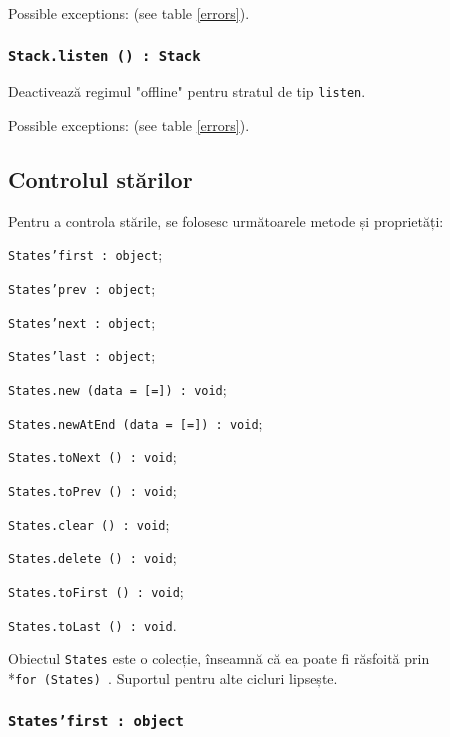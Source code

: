 Possible exceptions:  (see table \ref{errors}).

\subsubsection{\texttt{Stack.listen () : Stack}}

Deactivează regimul "offline" pentru stratul de tip \texttt{listen}.

Possible exceptions:  (see table \ref{errors}).

\subsection{Controlul stărilor}

Pentru a controla stările, se folosesc următoarele metode și proprietăți:
\begin{icItems}
	\item \texttt{States'first : object};
	\item \texttt{States'prev : object};
	\item \texttt{States'next : object};
	\item \texttt{States'last : object};
	\item \texttt{States.new (data = [=]) : void};
	\item \texttt{States.newAtEnd (data = [=]) : void};
	\item \texttt{States.toNext () : void};
	\item \texttt{States.toPrev () : void};
	\item \texttt{States.clear () : void};
	\item \texttt{States.delete () : void};
	\item \texttt{States.toFirst () : void};
	\item \texttt{States.toLast () : void}.
\end{icItems}

Obiectul \texttt{States} este o colecție, înseamnă că ea poate fi răsfoită prin \\*\texttt{for (States) {}}. Suportul pentru alte cicluri lipsește.

\subsubsection{\texttt{States'first : object}}

